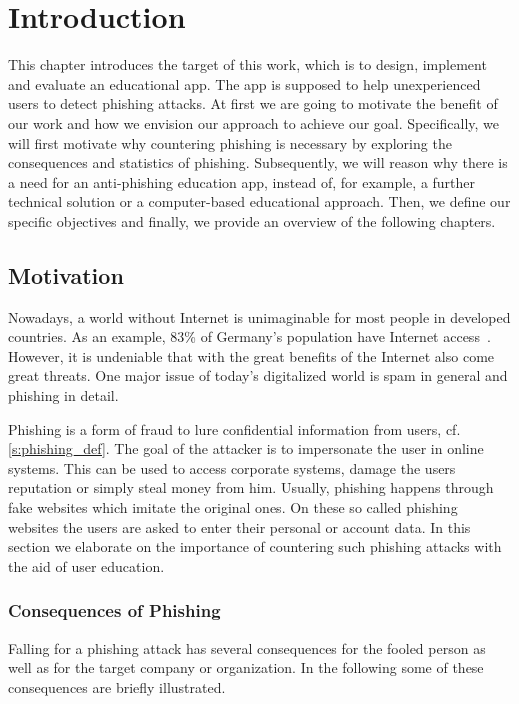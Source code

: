 \section{Introduction}
\label{s:introduction}
This chapter introduces the target of this work, which is to design, implement and evaluate an educational app.
 The app is supposed to help unexperienced users to detect phishing attacks.
 At first we are going to motivate the benefit of our work and how we envision our approach to achieve our goal.
Specifically, we will first motivate why countering phishing is necessary by exploring the consequences and statistics of phishing.
Subsequently, we will reason why there is a need for an anti-phishing education app, instead of, for example, a further technical solution or a computer-based educational approach.
 Then, we define our specific objectives and finally, we provide an overview of the following chapters.


\subsection{Motivation}
Nowadays, a world without Internet is unimaginable for most people in developed countries.
As an example, 83\% of Germany's population have Internet access~\cite{globalfinance2012internetusage}. 
However, it is undeniable that with the great benefits of the Internet also come great threats. 
One major issue of today's digitalized world is spam in general and phishing in detail. 

Phishing is a form of fraud to lure confidential information from users, cf. \autoref{s:phishing_def}. The goal of the attacker is to impersonate the user in online systems.
 This can be used to access corporate systems, damage the users reputation or simply steal money from him.
 Usually, phishing happens through fake websites which imitate the original ones.
 On these so called phishing websites the users are asked to enter their personal or account data.
 In this section we elaborate on the importance of countering such phishing attacks with the aid of user education. 



\subsubsection{Consequences of Phishing}
Falling for a phishing attack has several consequences for the fooled person as well as for the target company or organization.
 In the following some of these consequences are briefly illustrated.

